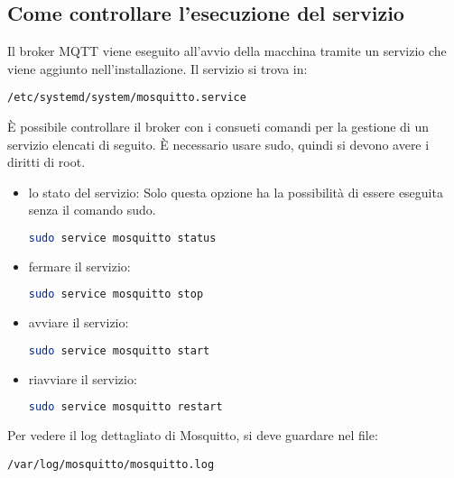\subsection{Come controllare l'esecuzione del servizio}
Il broker MQTT viene eseguito all'avvio della macchina tramite un servizio che viene aggiunto nell'installazione.
Il servizio si trova in:
\begin{lstlisting}[language=textnonum]
    /etc/systemd/system/mosquitto.service
\end{lstlisting}
È possibile controllare il broker con i consueti comandi per la gestione di un servizio elencati di seguito.
È necessario usare sudo, quindi si devono avere i diritti di root.
\begin{itemize}
    \item lo stato del servizio:
    \newline Solo questa opzione ha la possibilità di essere eseguita senza il comando sudo.
    \begin{lstlisting}[language=bash]
        sudo service mosquitto status
    \end{lstlisting}
    \item fermare il servizio:
    \begin{lstlisting}[language=bash]
        sudo service mosquitto stop
    \end{lstlisting}
    \item avviare il servizio:
    \begin{lstlisting}[language=bash]
        sudo service mosquitto start
    \end{lstlisting}
    \item riavviare il servizio:
    \begin{lstlisting}[language=bash]
        sudo service mosquitto restart
    \end{lstlisting}
\end{itemize}
Per vedere il log dettagliato di Mosquitto, si deve guardare nel file:
\begin{lstlisting}[language=textnonum]
    /var/log/mosquitto/mosquitto.log
\end{lstlisting}


